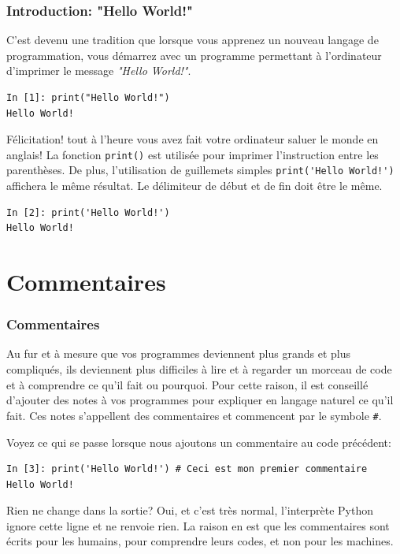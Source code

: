 \documentclass{beamer}
\begin{document}
\begin{frame}
\frametitle{Introduction: "Hello World!"}

C'est devenu une tradition que lorsque vous apprenez un nouveau langage de programmation, vous démarrez avec un programme permettant à l'ordinateur d'imprimer le message \emph{"Hello World!"}.

\begin{verbatim}
In [1]: print("Hello World!")
Hello World!
\end{verbatim}

Félicitation! tout à l'heure vous avez fait votre ordinateur saluer le monde en anglais! La fonction \texttt{print()} est utilisée pour imprimer l’instruction entre les parenthèses. De plus, l'utilisation de guillemets simples \Verb?print('Hello World!')? affichera le même résultat. Le délimiteur de début et de fin doit être le même.

\begin{verbatim}
In [2]: print('Hello World!')
Hello World!
\end{verbatim}


\end{frame}

\section{Commentaires}

\begin{frame}
\frametitle{Commentaires}


Au fur et à mesure que vos programmes deviennent plus grands et plus compliqués, ils deviennent plus difficiles à lire et à regarder un morceau de code et à comprendre ce qu'il fait ou pourquoi. Pour cette raison, il est conseillé d’ajouter des notes à vos programmes pour expliquer en langage naturel ce qu’il fait. Ces notes s'appellent des commentaires et commencent par le symbole \Verb!#!.

Voyez ce qui se passe lorsque nous ajoutons un commentaire au code précédent:

\begin{verbatim}
In [3]: print('Hello World!') # Ceci est mon premier commentaire
Hello World!
\end{verbatim}
Rien ne change dans la sortie? Oui, et c’est très normal, l’interprète Python ignore cette ligne et ne renvoie rien. La raison en est que les commentaires sont écrits pour les humains, pour comprendre leurs codes, et non pour les machines.


\end{frame}
\end{document}
